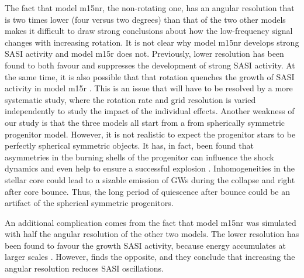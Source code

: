 {The fact that model m15nr, the non-rotating one, has an angular resolution that is two times lower
(four versus two degrees) than that of the two other models makes it difficult to draw strong conclusions about how the low-frequency signal changes with increasing rotation. It is not clear why model m15nr develops strong SASI
activity and model m15r does not. Previously, lower resolution has been found to both favour \citep{hanke_12} and suppresses \citep{abdikamalov_15} the development of strong SASI activity. At the same time, 
it is also possible that that rotation quenches the growth of SASI activity in model m15r \citep{kazeroni_17}.
This is an issue that will have to be resolved by a more systematic study, where the rotation rate and grid resolution
is varied independently to study the impact of the individual effects.
Another weakness of our study is that the three
models all start from a from spherically symmetric progenitor model. 
However, it is not realistic to expect the progenitor stars to be perfectly spherical symmetric objects.
It has, in fact, been found that asymmetries in the burning shells of the progenitor can influence the shock dynamics and even help to ensure a
successful explosion \citep{burrows_96,fryer_04,arnett_11,couch_13,mueller_15a}. Inhomogeneities in the stellar core could lead to a sizable emission of GWs during the collapse and right after core bounce. Thus, the long period of quiescence after bounce could be an artifact of the spherical symmetric progenitors.

An additional complication comes from the fact that model m15nr was simulated with half the angular resolution of the other two models. The lower resolution has been found
to favour the growth SASI activity, because energy accumulates at larger scales \citep{hanke_12}.
However, \cite{abdikamalov_15} finds the opposite, and they conclude that increasing the angular resolution reduces SASI oscillations. 
}



